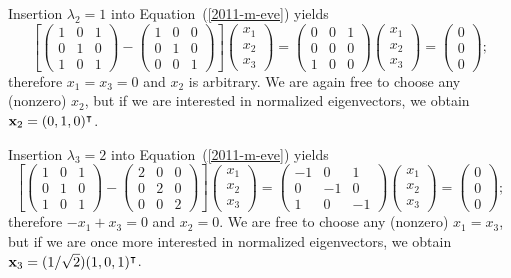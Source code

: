 {Insertion  $\lambda_2=1$ into Equation~(\ref{2011-m-eve}) yields
\begin{equation}
\left[
\begin{pmatrix}
1&0&1\\
0&1&0\\
1&0&1
\end{pmatrix}  -
\begin{pmatrix}
1&0&0\\
0&1&0\\
0&0&1
\end{pmatrix}
\right]
\begin{pmatrix}
x_1\\
x_2\\
x_3
\end{pmatrix}
=
\begin{pmatrix}
0&0&1\\
0&0&0\\
1&0&0
\end{pmatrix}
\begin{pmatrix}
x_1\\
x_2\\
x_3
\end{pmatrix}
=
\begin{pmatrix}
0\\
0\\
0
\end{pmatrix}
;
\end{equation}
therefore $x_1=x_3=0$ and $x_2$ is arbitrary.
We are again free to choose any (nonzero) $x_2$,
but if we are interested in normalized eigenvectors, we obtain
${\bf x}_2 = (0,1,0)^\intercal $.


Insertion  $\lambda_3=2$ into Equation~(\ref{2011-m-eve}) yields
\begin{equation}
\left[
\begin{pmatrix}
1&0&1\\
0&1&0\\
1&0&1
\end{pmatrix}  -
\begin{pmatrix}
2&0&0\\
0&2&0\\
0&0&2
\end{pmatrix}
\right]
\begin{pmatrix}
x_1\\
x_2\\
x_3
\end{pmatrix}
=
\begin{pmatrix}
-1&0&1\\
0&-1&0\\
1&0&-1
\end{pmatrix}
\begin{pmatrix}
x_1\\
x_2\\
x_3
\end{pmatrix}
=
\begin{pmatrix}
0\\
0\\
0
\end{pmatrix}
;
\end{equation}
therefore $-x_1+x_3=0$ and $x_2=0$.
We are free to choose any (nonzero) $x_1=x_3$,
but if we are once more interested in normalized eigenvectors, we obtain
${\bf x}_3 =(1/\sqrt{2})(1,0,1)^\intercal $.

}

